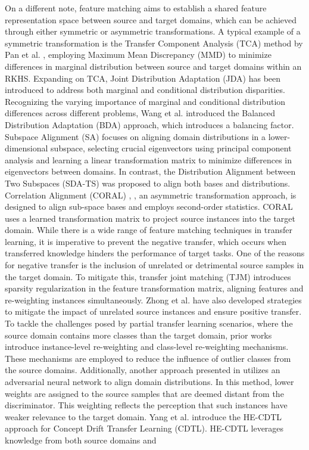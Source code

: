 On a different note, feature matching aims to establish a shared feature representation space between source and target domains, which can be achieved through either symmetric or asymmetric transformations. A typical example of a symmetric transformation is the Transfer Component Analysis (TCA) method by Pan et al. \cite{sun2016return}, employing Maximum Mean Discrepancy (MMD) \cite{zhu2020deep, long2018transferable}  \cite{long2013transfer} to minimize differences in marginal distribution between source and target domains within an RKHS. Expanding on TCA, Joint Distribution Adaptation (JDA) \cite{wang2020transfer} has been introduced to address both marginal and conditional distribution disparities. Recognizing the varying importance of marginal and conditional distribution differences across different problems, Wang et al. \cite{wang2020transfer, fernando2013unsupervised} introduced the Balanced Distribution Adaptation (BDA) approach, which introduces a balancing factor. Subspace Alignment (SA) \cite{pearson1901liii} focuses on aligning domain distributions in a lower-dimensional subspace, selecting crucial eigenvectors using principal component analysis \cite{pearson1901liii} and learning a linear transformation matrix to minimize differences in eigenvectors between domains. In contrast, the Distribution Alignment between Two Subspaces (SDA-TS) \cite{pan2010domain} was proposed to align both bases and distributions. Correlation Alignment (CORAL) \cite{rahman2020correlation}, \cite{long2014transfer}, an asymmetric transformation approach, is designed to align sub-space bases and employs second-order statistics. CORAL uses a learned transformation matrix to project source instances into the target domain. While there is a wide range of feature matching techniques in transfer learning, it is imperative to prevent the negative transfer, which occurs when transferred knowledge hinders the performance of target tasks. One of the reasons for negative transfer is the inclusion of unrelated or detrimental source samples in the target domain. To mitigate this, transfer joint matching (TJM) \cite{zhong2009cross} introduces sparsity regularization in the feature transformation matrix, aligning features and re-weighting instances simultaneously. Zhong et al. \cite{cao2018partial} have also developed strategies to mitigate the impact of unrelated source instances and ensure positive transfer. To tackle the challenges posed by partial transfer learning scenarios, where the source domain contains more classes than the target domain, prior works \cite{cao2019learning, li2020dual, yang2021concept} introduce instance-level re-weighting and class-level re-weighting mechanisms. These mechanisms are employed to reduce the influence of outlier classes from the source domains. Additionally, another approach presented in \cite{shan2018online} utilizes an adversarial neural network to align domain distributions. In this method, lower weights are assigned to the source samples that are deemed distant from the discriminator. This weighting reflects the perception that such instances have weaker relevance to the target domain. Yang et al. \cite{powers2020evaluation} introduce the HE-CDTL approach for Concept Drift Transfer Learning (CDTL). HE-CDTL leverages knowledge from both source domains and 